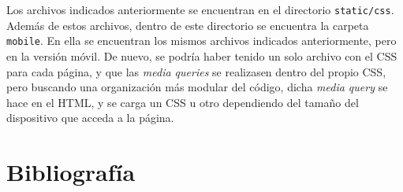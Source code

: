 \documentclass[11pt]{article}
\theoremstyle{plain}
\theoremstyle{definition}
\begin{document}
Los archivos indicados anteriormente se encuentran en el directorio
\texttt{static/css}. Además de estos archivos, dentro de este directorio
se encuentra la carpeta \texttt{mobile}. En ella se encuentran los mismos
archivos indicados anteriormente, pero en la versión móvil. De nuevo, se
podría haber tenido un solo archivo con el CSS para cada página, y que las
\textit{media queries} se realizasen dentro del propio CSS, pero buscando
una organización más modular del código, dicha \textit{media query} se hace
en el HTML, y se carga un CSS u otro dependiendo del tamaño del dispositivo
que acceda a la página.

\section{Bibliografía}

\printbibliography
\end{document}
